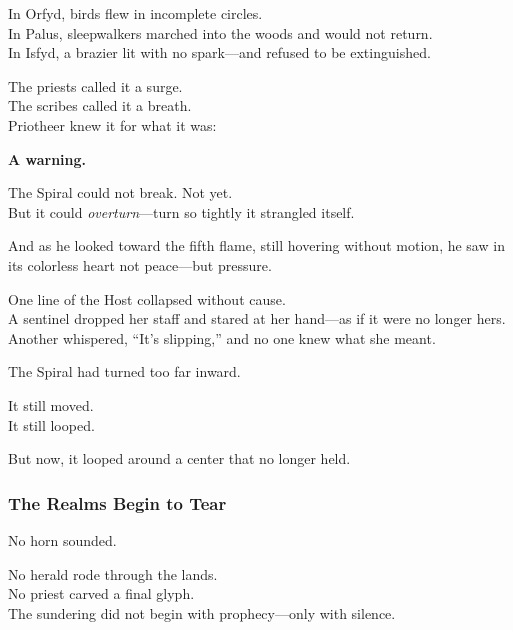 \documentclass[12pt]{article}
\begin{document}
\vspace{0.5em}
In Orfyd, birds flew in incomplete circles.\\
In Palus, sleepwalkers marched into the woods and would not return.\\
In Isfyd, a brazier lit with no spark---and refused to be extinguished.

\vspace{0.5em}
The priests called it a surge.\\
The scribes called it a breath.\\
Priotheer knew it for what it was:

\vspace{0.5em}
\textbf{A warning.}

\vspace{0.5em}
The Spiral could not break. Not yet.\\
But it could \textit{overturn}---turn so tightly it strangled itself.

\vspace{0.5em}
And as he looked toward the fifth flame, still hovering without motion, he saw in its colorless heart not peace---but pressure.

\vspace{0.5em}
One line of the Host collapsed without cause.\\
A sentinel dropped her staff and stared at her hand---as if it were no longer hers.\\
Another whispered, ``It’s slipping,'' and no one knew what she meant.

\vspace{0.5em}
The Spiral had turned too far inward.

\vspace{0.5em}
It still moved.\\
It still looped.

\vspace{0.5em}
But now, it looped around a center that no longer held.

\dotfill

\subsubsection*{The Realms Begin to Tear}

No horn sounded.

\vspace{0.5em}
No herald rode through the lands.\\
No priest carved a final glyph.\\
The sundering did not begin with prophecy---only with silence.
\end{document}
